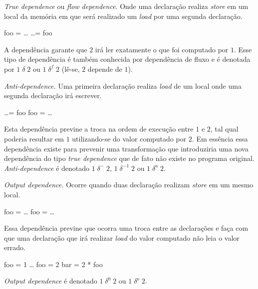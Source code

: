 \begin{alineas}
\item \textit{True dependence} ou \textit{flow dependence}. Onde uma declaração realiza 
        \textit{store} em um local da memória em que será realizado um 
        \textit{load} por uma segunda declaração.
        \begin{algorithmic}[1]
        \STATE foo = \ldots
        \STATE \ldots = foo
        \end{algorithmic}
        A dependência garante que $2$ irá ler exatamente o que foi computado
        por $1$. Esse tipo de dependência é também conhecida por dependência 
        de fluxo e é denotada por  $1 \;\delta\; 2$ ou $1 \;\delta^f \; 2$ 
        (lê-se, $2$ depende de $1$).

        \item \textit{Anti-dependence.} Uma primeira declaração realiza
        \textit{load} de um local onde uma segunda declaração irá escrever.
        \begin{algorithmic}[1]
        \STATE \ldots = foo
        \STATE foo = \ldots
        \end{algorithmic}
        Esta dependência previne a troca na ordem de execução entre $1$ 
        e $2$, tal qual poderia resultar em $1$ utilizando-se do valor 
        computado por $2$. 
        Em essência essa dependência existe para prevenir uma transformação que 
        introduziria uma nova dependência do tipo \textit{true dependence} que 
        de fato não existe no programa original. 
        \textit{Anti-dependence} é denotado $1 \;\delta^- \;2$, 
        $1 \;\delta^{-1} \;2$ ou $1 \;\delta^{a} \;2$.

        \item \textit{Output dependence.} Ocorre quando duas declaração 
        realizam \textit{store} em um mesmo local.
        \begin{algorithmic}[1]
        \STATE foo = \ldots
        \STATE foo = \ldots
        \end{algorithmic}
        Essa dependência previne que ocorra uma troca entre as declarações e 
        faça com que uma declaração que irá realizar \textit{load} do valor 
        computado não leia o valor errado.
        \begin{algorithmic}[1]
        \STATE foo = 1
        \STATE \ldots
        \STATE foo = 2
        \STATE bar = 2 * foo
        \end{algorithmic}
        \textit{Output dependence} é denotado  $1 \;\delta^0 \;2$
        ou $1 \;\delta^o \;2$.
\end{alineas}

